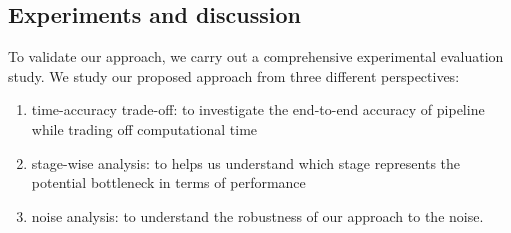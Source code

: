 \subsection{Experiments and discussion}
To validate our approach, we carry out a comprehensive experimental evaluation study.  We study our proposed approach from three different perspectives: 

\begin{enumerate}
\item time-accuracy trade-off: to investigate the end-to-end accuracy of pipeline while trading off computational time
\item stage-wise analysis: to helps us understand which stage represents the potential bottleneck in terms of performance
\item noise analysis: to understand the robustness of our approach to the noise.
\end{enumerate}

\vspace{5pt}
